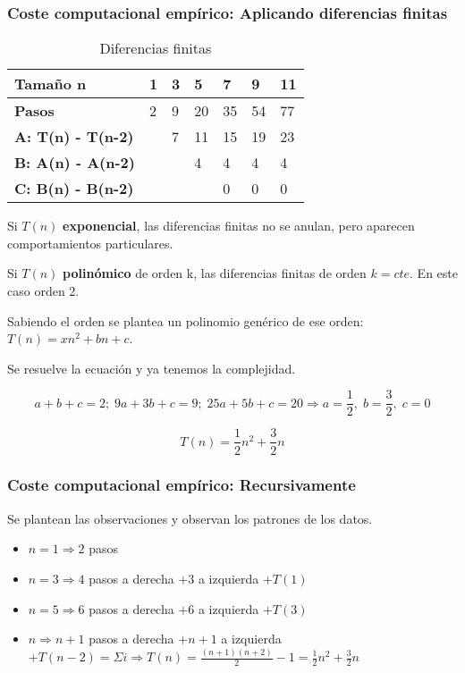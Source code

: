\subsubsection{Coste computacional empírico: Aplicando diferencias finitas}
\begin{table}[H]
    \begin{tabular}{|l|l|l|l|l|l|l|}
    \hline
    Tamaño n                  & \textbf{1} & \textbf{3} & \textbf{5} & \textbf{7} & \textbf{9} & \textbf{11} \\ \hline
    \textbf{Pasos}            & 2          & 9          & 20         & 35         & 54         & 77          \\ \hline
    \textbf{A: T(n) - T(n-2)} &            & 7          & 11         & 15         & 19         & 23          \\ \hline
    \textbf{B: A(n) - A(n-2)} &            &            & 4          & 4          & 4          & 4           \\ \hline
    \textbf{C: B(n) - B(n-2)} &            &            &            & 0          & 0          & 0           \\ \hline
    \end{tabular}
    \caption{Diferencias finitas}
\end{table}

Si $T(n)$ \textbf{exponencial}, las diferencias finitas no se anulan, pero aparecen comportamientos particulares.

Si $T(n)$ \textbf{polinómico} de orden k, las diferencias finitas de orden $k=cte$. En este caso orden 2.

Sabiendo el orden se plantea un polinomio genérico de ese orden: $T(n)=xn^2+bn+c$.

Se resuelve la ecuación y ya tenemos la complejidad.

$$a+b+c=2;\; 9a+3b+c=9;\; 25a+5b+c=20 \Rightarrow a=\frac{1}{2},\; b=\frac{3}{2},\; c=0$$

$$T(n)=\frac{1}{2}n^2+\frac{3}{2}n$$

\subsubsection{Coste computacional empírico: Recursivamente}
Se plantean las observaciones y observan los patrones de los datos.

\begin{itemize}
    \item $n=1 \Rightarrow 2$ pasos
    \item $n=3 \Rightarrow 4$ pasos a derecha $+ 3$ a izquierda $+ T(1)$
    \item $n=5 \Rightarrow 6$ pasos a derecha $+ 6$ a izquierda $+ T(3)$
    \item $n \Rightarrow n+1$ pasos a derecha $+ n+1$ a izquierda $+ T(n-2) = \Sigma i \Rightarrow T(n)=\frac{(n+1)(n+2)}{2}-1=\frac{1}{2}n^2+\frac{3}{2}n$ 
\end{itemize}

